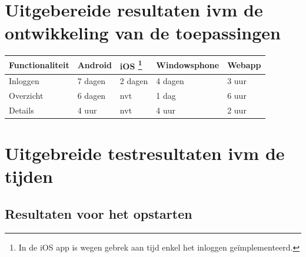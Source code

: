 \documentclass[pdftex,a4paper,12pt,twoside]{report}
\begin{document}
\tableofcontents

\appendix

\chapter{Uitgebereide resultaten ivm de ontwikkeling van de toepassingen}
\label{ch:uitgebereideresultatenmetbetrekkingtotontwikkeling}
\begin{center}
  \begin{tabular}{ | l | l | l | l | l |}
    \hline
    Functionaliteit & Android & iOS \footnote{In de iOS app is wegen gebrek aan tijd enkel het inloggen geïmplementeerd.} & Windowsphone & Webapp
    \\ \hline
    Inloggen & 7 dagen & 2 dagen & 4 dagen & 3 uur
    \\ \hline
    Overzicht & 6 dagen & nvt & 1 dag & 6 uur
    \\ \hline
    Details & 4 uur & nvt & 4 uur & 2 uur
    \\ \hline
  \end{tabular}
\end{center}


\chapter{Uitgebreide testresultaten ivm de tijden}
\label{ch:uitgebereidresultatenmetbetrekkingtottijden}

\section{Resultaten voor het opstarten}
\end{document}
